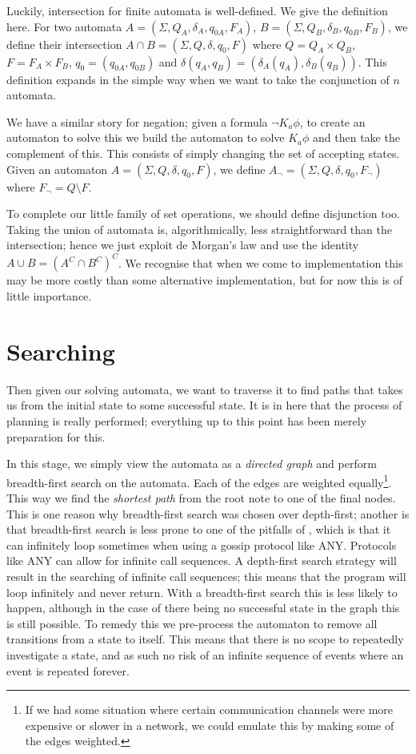 \documentclass[10pt, a4paper]{report}
\begin{document}
Luckily, intersection for finite automata is well-defined. We give the
definition here. For two automata $A = (\Sigma, Q_A, \delta_A, q_{0A}, F_A)$, $B
= (\Sigma, Q_B, \delta_B, q_{0B}, F_B)$, we define their intersection $A \cap B
= (\Sigma, Q, \delta, q_0, F)$ where $Q = Q_A \times Q_B$, $F = F_A \times F_B$,
$q_0 = (q_{0A}, q_{0B})$ and $\delta(q_A, q_B) = (\delta_A(q_A),
\delta_B(q_B))$. This definition expands in the simple way when we want to take
the conjunction of $n$ automata.

We have a similar story for negation; given a formula $\neg K_a \phi$, to create
an automaton to solve this we build the automaton to solve $K_a \phi$ and then
take the complement of this. This consists of simply changing the set of
accepting states. Given an automaton $A = (\Sigma, Q, \delta, q_0, F)$, we define
$A_\neg = (\Sigma, Q, \delta, q_0, F_\neg)$ where $F_\neg = Q \setminus F$.

To complete our little family of set operations, we should define disjunction
too. Taking the union of automata is, algorithmically, less straightforward than
the intersection; hence we just exploit de Morgan's law and use the identity $A
\cup B = (A^C \cap B^C)^C$. We recognise that when we come to implementation
this may be more costly than some alternative implementation, but for now this
is of little importance. 

\section{Searching}

Then given our solving automata, we want to traverse it to find paths that takes
us from the initial state to some successful state. It is in here that the
process of planning is really performed; everything up to this point has been
merely preparation for this. 

In this stage, we simply view the automata as a \emph{directed graph} and
perform breadth-first search on the automata. Each of the edges are weighted
equally\footnote{If we had some situation where certain communication channels
  were more expensive or slower in a network, we could emulate this by making
  some of the edges weighted.}. This way we find the \emph{shortest path} from
the root note to one of the final nodes. This is one reason why breadth-first
search was chosen over depth-first; another is that breadth-first search is
less prone to one of the pitfalls of \cite{GithubGossip}, which is that it can
infinitely loop sometimes when using a gossip protocol like \textsf{ANY}.
Protocols like \textsf{ANY} can allow for infinite call sequences. A depth-first
search strategy will result in the searching of infinite call sequences; this
means that the program will loop infinitely and never return. With a
breadth-first search this is less likely to happen, although in the case of
there being no successful state in the graph this is still possible. To remedy
this we pre-process the automaton to remove all transitions from a state to
itself. This means that there is no scope to repeatedly investigate a state, and
as such no risk of an infinite sequence of events where an event is repeated
forever.
\end{document}

